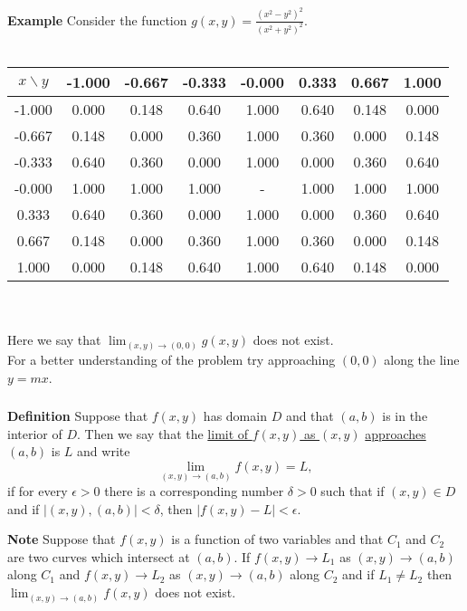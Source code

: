 \begin{frame}[fragile]\frametitle{}
 
\textbf{Example}
Consider the function $g(x,y) = \frac{ (x^2-y^2)^2 }{(x^2+y^2)^2}$.  
\ \\ \ \\
\begin{tabular}{|c|c|c|c|c|c|c|c|}
\hline
$x\backslash y$&-1.000&-0.667&-0.333&-0.000&0.333&0.667&1.000 \\ 
\hline
-1.000&0.000&0.148&0.640&1.000&0.640&0.148&0.000\\ 
\hline
-0.667&0.148&0.000&0.360&1.000&0.360&0.000&0.148\\ 
\hline
-0.333&0.640&0.360&0.000&1.000&0.000&0.360&0.640\\ 
\hline
-0.000&1.000&1.000&1.000& - &1.000&1.000&1.000\\ 
\hline
0.333&0.640&0.360&0.000&1.000&0.000&0.360&0.640\\ 
\hline
0.667&0.148&0.000&0.360&1.000&0.360&0.000&0.148\\ 
\hline
1.000&0.000&0.148&0.640&1.000&0.640&0.148&0.000\\ 
\hline
\end{tabular}  
\ \\ \ \\
Here we say that $\lim_{(x,y) \rightarrow (0,0)} g(x,y)$ does not exist.  \\ 
For a better understanding of the problem try approaching $(0,0)$ along the line $y=mx$.


\end{frame}


\begin{frame}[fragile]\frametitle{}
 
\textbf{Definition}
Suppose that $f(x,y)$ has domain $D$ and that $(a,b)$ is in the interior of $D$.  Then we say that the \underline{limit of $f(x,y)$ as
$(x,y)$} \underline{approaches $(a,b)$} is $L$ and write
$$
\lim_{(x,y)\rightarrow (a,b)} f(x,y) = L,
$$
if for every $\epsilon >0$ there is a corresponding number $\delta>0$ such that if $(x,y)\in D$ and if $|(x,y),(a,b)|<\delta$, then
$|f(x,y)-L|<\epsilon$.
  

\textbf{Note}
Suppose that $f(x,y)$ is a function of two variables and that $C_1$ and $C_2$ are two curves which intersect at $(a,b)$.  If $f(x,y)\rightarrow L_1$ as $(x,y)\rightarrow (a,b)$ along $C_1$ and $f(x,y)\rightarrow L_2$ as $(x,y)\rightarrow (a,b)$ along $C_2$ and if $L_1\neq L_2$ then $\lim_{(x,y)\rightarrow (a,b)} f(x,y)$ does not exist.

\end{frame}



